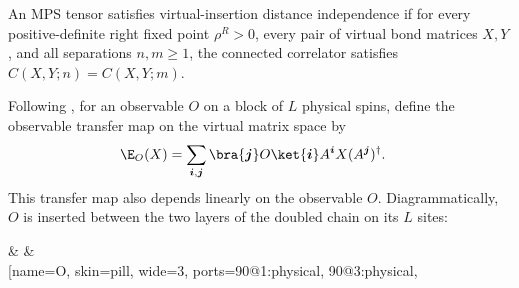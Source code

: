 \begin{definition}\label{def:is_cid}
    \leanok
    An MPS tensor satisfies virtual-insertion distance independence if for every
    positive-definite right fixed point $\rho^R>0$, every pair of virtual bond
    matrices $X,Y$, and all separations $n,m\geq1$, the connected correlator
    satisfies $C(X,Y;n)=C(X,Y;m)$.
\end{definition}

\begin{definition}
    \label{def:physical_observable_transfer}
    \leanok
    Following \cite[lines~490--496]{Cirac2016MPDO_arXiv}, for an observable $O$
    on a block of $L$ physical spins, define the observable transfer map on the
    virtual matrix space by
    \begin{align}
        \E_O(X)
         & =\sum_{\boldsymbol i,\boldsymbol j}
        \bra{\boldsymbol j}O\ket{\boldsymbol i}
        A^{\boldsymbol i}X(A^{\boldsymbol j})^\dagger.
        \notag
    \end{align}
    This transfer map also depends linearly on the observable $O$.
    Diagrammatically, $O$ is inserted between the two layers of the doubled
    chain on its $L$ sites:
    \begin{center}
        \tenkzkernel
        \begin{tenkz}[rows={ket,op,bra}, cols=3, bonds=none]
             &
            \tn[name=kd, skin=dots, ports={180:virtual, 0:virtual}]{} &
             \\
            \tn[name=O, skin=pill, wide=3,
                ports={90@1:physical, 90@3:physical,
}
\end{tenkz}
\end{center}
\end{definition}
